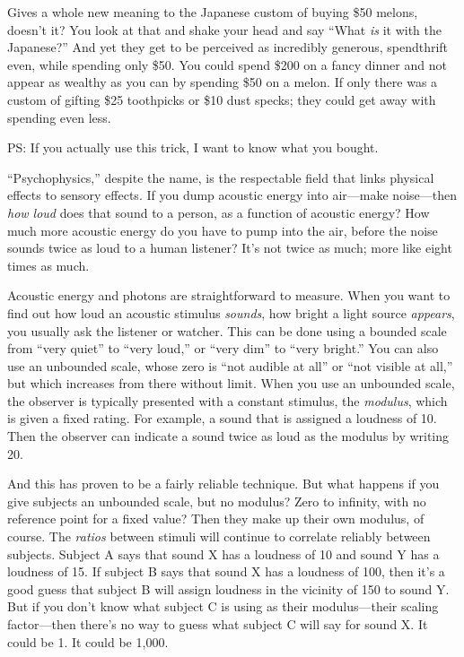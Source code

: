 {
 Gives a whole new meaning to the Japanese custom of buying \$50
melons, doesn't it? You look at that and shake your
head and say ``What \textit{is} it with the
Japanese?'' And yet they get to be perceived as
incredibly generous, spendthrift even, while spending only \$50. You
could spend \$200 on a fancy dinner and not appear as wealthy as you
can by spending \$50 on a melon. If only there was a custom of gifting
\$25 toothpicks or \$10 dust specks; they could get away with spending
even less.}

{
 PS: If you actually use this trick, I want to know what you
bought.}

\myendsectiontext


\bigskip


{
 ``Psychophysics,'' despite the
name, is the respectable field that links physical effects to sensory
effects. If you dump acoustic energy into air---make noise---then
\textit{how loud} does that sound to a person, as a function of
acoustic energy? How much more acoustic energy do you have to pump into
the air, before the noise sounds twice as loud to a human listener?
It's not twice as much; more like eight times as much.
}

{
 Acoustic energy and photons are straightforward to measure. When
you want to find out how loud an acoustic stimulus \textit{sounds}, how
bright a light source \textit{appears}, you usually ask the listener or
watcher. This can be done using a bounded scale from
``very quiet'' to
``very loud,'' or
``very dim'' to
``very bright.'' You can also use an
unbounded scale, whose zero is ``not audible at
all'' or ``not visible at
all,'' but which increases from there without limit.
When you use an unbounded scale, the observer is typically presented
with a constant stimulus, the \textit{modulus}, which is given a fixed
rating. For example, a sound that is assigned a loudness of 10. Then
the observer can indicate a sound twice as loud as the modulus by
writing 20.}

{
 And this has proven to be a fairly reliable technique. But what
happens if you give subjects an unbounded scale, but no modulus? Zero
to infinity, with no reference point for a fixed value? Then they make
up their own modulus, of course. The \textit{ratios} between stimuli
will continue to correlate reliably between subjects. Subject A says
that sound X has a loudness of 10 and sound Y has a loudness of 15. If
subject B says that sound X has a loudness of 100, then
it's a good guess that subject B will assign loudness
in the vicinity of 150 to sound Y. But if you don't
know what subject C is using as their modulus---their scaling
factor---then there's no way to guess what subject C
will say for sound X. It could be 1. It could be 1,000.}

